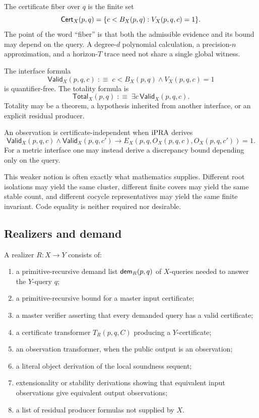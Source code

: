 The certificate fiber over \(q\) is the finite set
\[
  \mathsf{Cert}_X(p,q)=\{c<B_X(p,q):V_X(p,q,c)=1\}.
\]
The point of the word ``fiber'' is that both the admissible evidence and its
bound may depend on the query.  A degree-\(d\) polynomial calculation, a
precision-\(n\) approximation, and a horizon-\(T\) trace need not share a
single global witness.

\begin{definition}
The interface formula
\[
  \mathsf{Valid}_X(p,q,c)\;:\equiv\;c<B_X(p,q)\wedge V_X(p,q,c)=1
\]
is quantifier-free.  The totality formula is
\[
  \mathsf{Total}_X(p,q)\;:\equiv\;
  \exists c\,\mathsf{Valid}_X(p,q,c).
\]
Totality may be a theorem, a hypothesis inherited from another interface, or
an explicit residual producer.
\end{definition}

\begin{definition}
An observation is certificate-independent when \(\mathrm{iPRA}\) derives
\[
  \mathsf{Valid}_X(p,q,c)\wedge\mathsf{Valid}_X(p,q,c')
  \longrightarrow E_X(p,q,O_X(p,q,c),O_X(p,q,c'))=1.
\]
For a metric interface one may instead derive a discrepancy bound depending
only on the query.
\end{definition}

This weaker notion is often exactly what mathematics supplies.  Different
root isolations may yield the same cluster, different finite covers may yield
the same stable count, and different cocycle representatives may yield the
same finite invariant.  Code equality is neither required nor desirable.

\subsection{Realizers and demand}

\begin{definition}
A realizer \(R:X\to Y\) consists of:

\begin{enumerate}
\item a primitive-recursive demand list \(\mathsf{dem}_R(p,q)\) of \(X\)-queries
      needed to answer the \(Y\)-query \(q\);
\item a primitive-recursive bound for a master input certificate;
\item a master verifier asserting that every demanded query has a valid
      certificate;
\item a certificate transformer \(T_R(p,q,C)\) producing a \(Y\)-certificate;
\item an observation transformer, when the public output is an observation;
\item a literal object derivation of the local soundness sequent;
\item extensionality or stability derivations showing that equivalent input
      observations give equivalent output observations;
\item a list of residual producer formulas not supplied by \(X\).
\end{enumerate}
\end{definition}

